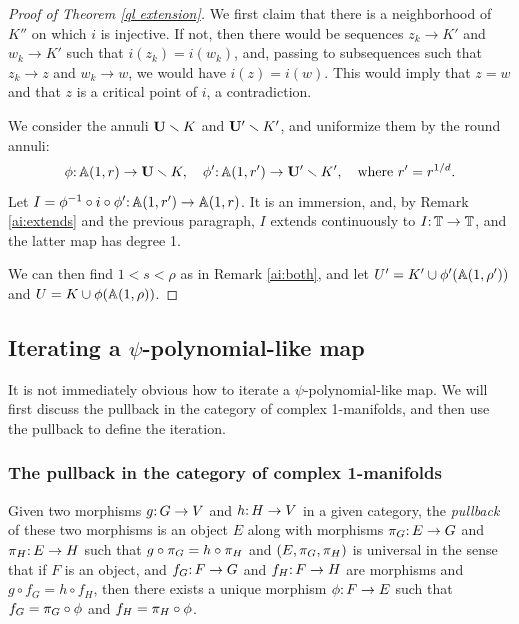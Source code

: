 \begin{proof}[Proof of Theorem \ref{ql extension}]
We first claim that there is a neighborhood of $K''$ on which $i$ is injective.
If not,
then there would be sequences $z_k \to K'$ and $w_k \to K'$ such that $i(z_k) = i(w_k)$,
and,
passing to subsequences such that $z_k \to z$ and $w_k \to w$,
we would have $i(z) = i(w)$.
This would imply that $z = w$ and that $z$ is a critical point of $i$, a contradiction.

We consider the annuli $\BU\sm K$ and $\BU'\sm K'$,
and uniformize them by the round annuli:
$$
\phi\from \A(1,r) \to \BU \sm K, \quad \phi'\from \A(1,r') \to \BU' \sm K',\quad \text{where}\ r'=r^{1/d}.
$$
Let $I= \phi^{-1}\circ i\circ \phi'\from \A(1,r')\to \A(1,r)$.
It is an immersion,
and,
by Remark \ref{ai:extends} and the previous paragraph,
$I$ extends continuously to $I\from \T\to\T$,
and the latter map has degree 1.

We can then find $1 < s < \rho$ as in Remark \ref{ai:both},
and let $U' = K' \cup \phi'(\aa {\rho'})$ and $U = K\cup \phi(\aa \rho)$. 
\end{proof}




\subsection{Iterating a $\psi$-polynomial-like map} \label{pseudo-iterate}
It is not immediately obvious how to iterate a $\psi$-polynomial-like map. 
We will first discuss the pullback in the category of complex 1-manifolds, 
and then use the pullback to define the iteration. 

\subsubsection{The pullback in the category of complex 1-manifolds}
Given two morphisms $g\from G\to V$ and $h\from H\to V$ in a given category,
the \emph{pullback} of these two morphisms is an object $E$ along with morphisms $\pg\from E \to G$ and $\ph\from E \to H$ 
such that $g \circ \pg = h \circ \ph$ 
and $(E, \pg, \ph)$ is universal in the sense that if $F$ is an object, and  $f_G\from F\to G$ and $f_H\from F\to H$ are morphisms
and $g\circ f_G = h\circ f_H$,  then there exists a unique morphism $\phi\from F\to E$
such that $f_G = \pg \circ \phi$ and $f_H = \ph \circ \phi$.
\begin{center}
\end{center}

